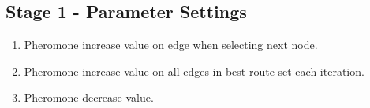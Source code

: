 \subsection{Stage 1 - Parameter Settings}

\begin{enumerate}
\item Pheromone increase value on edge when selecting next node.
\item Pheromone increase value on all edges in best route set each iteration.
\item Pheromone decrease value.
\end{enumerate}
